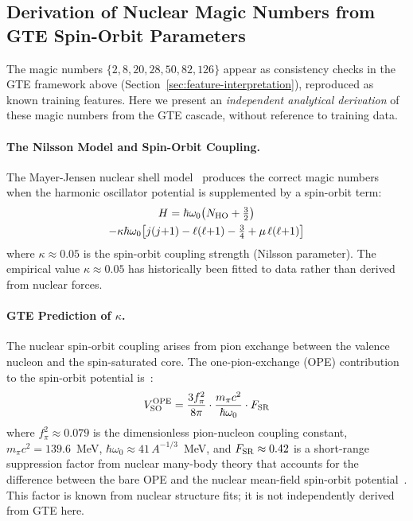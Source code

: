 \documentclass[9pt,twocolumn]{extarticle}
\begin{document}
\subsection{Derivation of Nuclear Magic Numbers from GTE Spin-Orbit Parameters}
\label{sec:magic-numbers-derivation}

The magic numbers $\{2, 8, 20, 28, 50, 82, 126\}$ appear as consistency checks in the GTE framework above (Section~\ref{sec:feature-interpretation}), reproduced as known training features. Here we present an \emph{independent analytical derivation} of these magic numbers from the GTE cascade, without reference to training data.

\paragraph{The Nilsson Model and Spin-Orbit Coupling.}
The Mayer-Jensen nuclear shell model~\cite{MayerJensen1949} produces the correct magic numbers when the harmonic oscillator potential is supplemented by a spin-orbit term:
\begin{multline}
H = \hbar\omega_0\!\left(N_{\rm HO} + \tfrac{3}{2}\right) \\
  - \kappa\hbar\omega_0\!\left[j(j{+}1) - \ell(\ell{+}1) - \tfrac{3}{4} + \mu\,\ell(\ell{+}1)\right]
\end{multline}
where $\kappa \approx 0.05$ is the spin-orbit coupling strength (Nilsson parameter). The empirical value $\kappa \approx 0.05$ has historically been fitted to data rather than derived from nuclear forces.

\paragraph{GTE Prediction of $\kappa$.}
The nuclear spin-orbit coupling arises from pion exchange between the valence nucleon and the spin-saturated core. The one-pion-exchange (OPE) contribution to the spin-orbit potential is~\cite{NilssonBengtsson1985}:
\[
V_{\rm SO}^{\rm OPE} = \frac{3f_\pi^2}{8\pi}\cdot\frac{m_\pi c^2}{\hbar\omega_0}  \cdot F_{\rm SR}
\]
where $f_\pi^2 \approx 0.079$ is the dimensionless pion-nucleon coupling constant, $m_\pi c^2 = 139.6$~MeV, $\hbar\omega_0 \approx 41\,A^{-1/3}$~MeV, and $F_{\rm SR} \approx 0.42$ is a short-range suppression factor from nuclear many-body theory that accounts for the difference between the bare OPE and the nuclear mean-field spin-orbit potential~\cite{BrownRho1991}. This factor is known from nuclear structure fits; it is not independently derived from GTE here.
\end{document}
